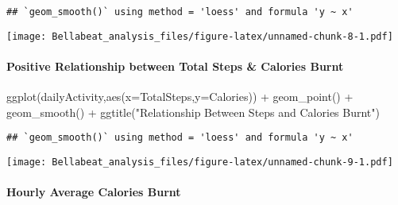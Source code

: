 \documentclass[
]{article}
\newenvironment{Shaded}{\begin{snugshade}}{\end{snugshade}}
\newcommand{\AttributeTok}[1]{\textcolor[rgb]{0.77,0.63,0.00}{#1}}
\newcommand{\FunctionTok}[1]{\textcolor[rgb]{0.00,0.00,0.00}{#1}}
\newcommand{\NormalTok}[1]{#1}
\newcommand{\SpecialCharTok}[1]{\textcolor[rgb]{0.00,0.00,0.00}{#1}}
\newcommand{\StringTok}[1]{\textcolor[rgb]{0.31,0.60,0.02}{#1}}
\begin{document}
\begin{verbatim}
## `geom_smooth()` using method = 'loess' and formula 'y ~ x'
\end{verbatim}

\texttt{[image: Bellabeat\_analysis\_files/figure-latex/unnamed-chunk-8-1.pdf]}

\hypertarget{positive-relationship-between-total-steps-calories-burnt}{%
\paragraph{Positive Relationship between Total Steps \& Calories
Burnt}\label{positive-relationship-between-total-steps-calories-burnt}}

\begin{Shaded}
\begin{Highlighting}[]
\FunctionTok{ggplot}\NormalTok{(dailyActivity,}\FunctionTok{aes}\NormalTok{(}\AttributeTok{x=}\NormalTok{TotalSteps,}\AttributeTok{y=}\NormalTok{Calories)) }\SpecialCharTok{+} \FunctionTok{geom\_point}\NormalTok{() }\SpecialCharTok{+} \FunctionTok{geom\_smooth}\NormalTok{() }\SpecialCharTok{+}
  \FunctionTok{ggtitle}\NormalTok{(}\StringTok{"Relationship Between Steps and Calories Burnt"}\NormalTok{)}
\end{Highlighting}
\end{Shaded}

\begin{verbatim}
## `geom_smooth()` using method = 'loess' and formula 'y ~ x'
\end{verbatim}

\texttt{[image: Bellabeat\_analysis\_files/figure-latex/unnamed-chunk-9-1.pdf]}

\hypertarget{hourly-average-calories-burnt}{%
\paragraph{Hourly Average Calories
Burnt}\label{hourly-average-calories-burnt}}
\end{document}
